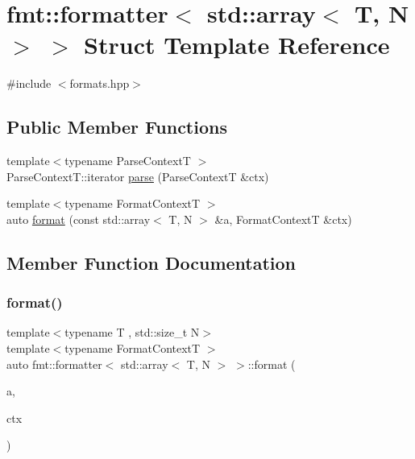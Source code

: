 \hypertarget{structfmt_1_1formatter_3_01std_1_1array_3_01_t_00_01_n_01_4_01_4}{}\section{fmt\+:\+:formatter$<$ std\+:\+:array$<$ T, N $>$ $>$ Struct Template Reference}
\label{structfmt_1_1formatter_3_01std_1_1array_3_01_t_00_01_n_01_4_01_4}


{\ttfamily \#include $<$formats.\+hpp$>$}

\subsection*{Public Member Functions}
\begin{DoxyCompactItemize}
\item 
{\footnotesize template$<$typename Parse\+ContextT $>$ }\\Parse\+Context\+T\+::iterator \mbox{\hyperlink{structfmt_1_1formatter_3_01std_1_1array_3_01_t_00_01_n_01_4_01_4_a282357230d9bb58bfff722acd404f1c2}{parse}} (Parse\+ContextT \&ctx)
\item 
{\footnotesize template$<$typename Format\+ContextT $>$ }\\auto \mbox{\hyperlink{structfmt_1_1formatter_3_01std_1_1array_3_01_t_00_01_n_01_4_01_4_ac65283b1f11fc155f7fab7746f09835d}{format}} (const std\+::array$<$ T, N $>$ \&a, Format\+ContextT \&ctx)
\end{DoxyCompactItemize}


\subsection{Member Function Documentation}
\mbox{\label{structfmt_1_1formatter_3_01std_1_1array_3_01_t_00_01_n_01_4_01_4_ac65283b1f11fc155f7fab7746f09835d}} 
\subsubsection{\texorpdfstring{format()}{format()}}
{\footnotesize\ttfamily template$<$typename T , std\+::size\+\_\+t N$>$ \\
template$<$typename Format\+ContextT $>$ \\
auto fmt\+::formatter$<$ std\+::array$<$ T, N $>$ $>$\+::format (\begin{DoxyParamCaption}\item[{const std\+::array$<$ T, N $>$ \&}]{a,  }\item[{Format\+ContextT \&}]{ctx }\end{DoxyParamCaption})}

